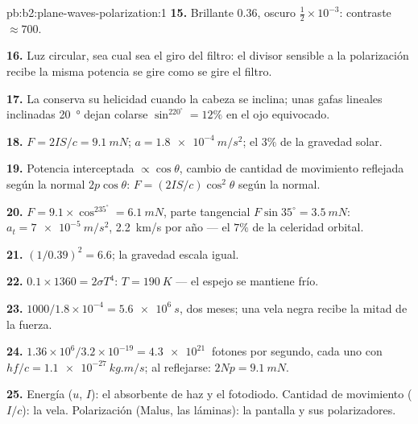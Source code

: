 \begin{solution}{pb:b2:plane-waves-polarization:1}
\textbf{15.} Brillante $0.36$, oscuro $\tfrac12 \times 10^{-3}$: contraste $\approx 700$.

\textbf{16.} Luz circular, sea cual sea el giro del filtro: el divisor
sensible a la polarización recibe la misma potencia se gire como se gire
el filtro.

\textbf{17.} La  conserva su helicidad cuando la
cabeza se inclina; unas gafas lineales inclinadas \qty{20}{\degree} dejan colarse $\sin^220^\circ = 12\%$ en
el ojo equivocado.

\textbf{18.} $F = 2IS/c = \qty{9.1}{mN}$; $a = \qty{1.8e-4}{m/s^2}$; el $3\%$ de la
gravedad solar.

\textbf{19.} Potencia interceptada $\propto\cos\theta$, cambio de cantidad de
movimiento reflejada según la normal $2p\cos\theta$: $F = (2IS/c)\cos^2\theta$ según la normal.

\textbf{20.} $F = 9.1 \times \cos^235^\circ = \qty{6.1}{mN}$, parte tangencial $F\sin35^\circ
= \qty{3.5}{mN}$: $a_t = \qty{7e-5}{m/s^2}$, \qty{2.2}{km/s} por año --- el $7\%$ de
la celeridad orbital.

\textbf{21.} $(1/0.39)^2 = 6.6$; la gravedad escala igual.

\textbf{22.} $0.1 \times 1360 = 2\sigma T^4$: $T = \qty{190}{K}$ --- el espejo se
mantiene frío.

\textbf{23.} $1000/1.8 \times 10^{-4} = \qty{5.6e6}{s}$, dos meses; una vela negra
recibe la mitad de la fuerza.

\textbf{24.} $1.36 \times 10^6/3.2 \times 10^{-19} = \qty{4.3e21}{}$ fotones por segundo,
cada uno con $hf/c = \qty{1.1e-27}{kg.m/s}$; al reflejarse: $2Np = \qty{9.1}{mN}$.

\textbf{25.} Energía ($u$, $I$): el absorbente de haz y el fotodiodo.
Cantidad de movimiento ($I/c$): la vela. Polarización (Malus, las
láminas): la pantalla y sus polarizadores.
\end{solution}
